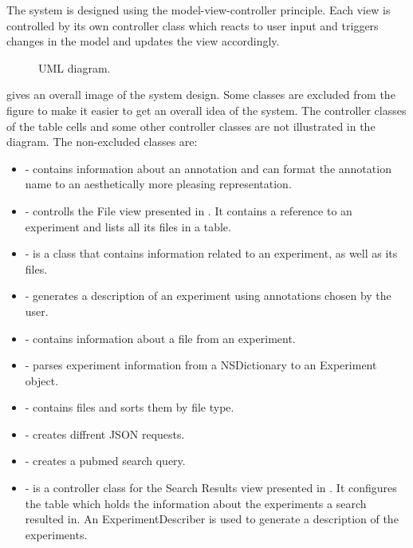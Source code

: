 The  system is designed using the model-view-controller principle. Each view is controlled by its own controller class which reacts to user input and triggers changes in the model and updates the view accordingly.
\begin{figure}[ht]
\caption{UML diagram.}
\label{fig:ios_UML}
\end{figure}
\FloatBarrier

 gives an overall image of the system design. Some classes are excluded from the figure to make it easier to get an overall idea of the system. The controller classes of the table cells and some other controller classes are not illustrated in the diagram. The non-excluded classes are:

\begin{itemize}

\item {} - contains information about an annotation and can format the annotation name to an aesthetically more pleasing representation.

\item {} - controlls the File view presented in . It contains a reference to an experiment and lists all its files in a table.

\item {} - is a class that contains information related to an experiment, as well as its files.

\item {} - generates a description of an experiment using annotations chosen by the user.

\item {} - contains information about a file from an experiment.

\item {} - parses experiment information from a NSDictionary to an Experiment object.

\item {} - contains files and sorts them by file type.

\item {} - creates diffrent JSON requests.

\item {} - creates a pubmed search query.

\item {} - is a controller class for the Search Results view presented in  . It configures the table which holds the information about the experiments a search resulted in. An ExperimentDescriber is used to generate a description of the experiments.


\end{itemize}
